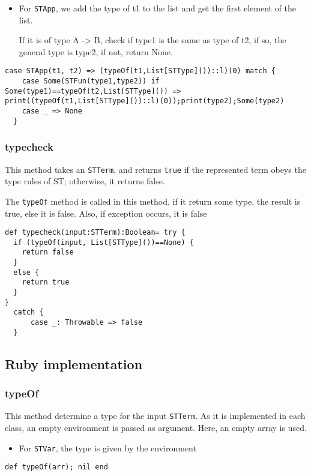 \documentclass[11pt]{article}
\begin{document}
\begin{itemize}
\item For \texttt{STApp}, we add the type of t1 to the list and get the first element of the list.

If it is of type A -> B, check if type1 is the same as type of t2, if so, the general type is type2, if not, return None.
\end{itemize}
\begin{verbatim}
case STApp(t1, t2) => (typeOf(t1,List[STType]())::l)(0) match {
    case Some(STFun(type1,type2)) if Some(type1)==typeOf(t2,List[STType]()) => print((typeOf(t1,List[STType]())::l)(0));print(type2);Some(type2)
    case _ => None 
  } 
\end{verbatim}


\subsubsection{typecheck}
\label{sec:org06f907c}
This method takes an \texttt{STTerm}, and returns \texttt{true} if the represented term obeys the type rules of ST; 
otherwise, it returns false.

The \texttt{typeOf} method is called in this method, if it return some type, the result is true, else it is false. 
Also, if exception occurs, it is false
\begin{verbatim}
def typecheck(input:STTerm):Boolean= try {
  if (typeOf(input, List[STType]())==None) {
    return false
  }
  else {
    return true
  }
}
  catch {
      case _: Throwable => false
  }
\end{verbatim}


\subsection{Ruby implementation}
\label{sec:org21db10b}
\subsubsection{typeOf}
\label{sec:org5bd96e5}
This method determine a type for the input \texttt{STTerm}. 
As it is implemented in each class, an empty environment is passed as argument. Here, an empty array is used.

\begin{itemize}
\item For \texttt{STVar}, the type is given by the environment
\end{itemize}
\begin{verbatim}
def typeOf(arr); nil end
\end{verbatim}
\end{document}
